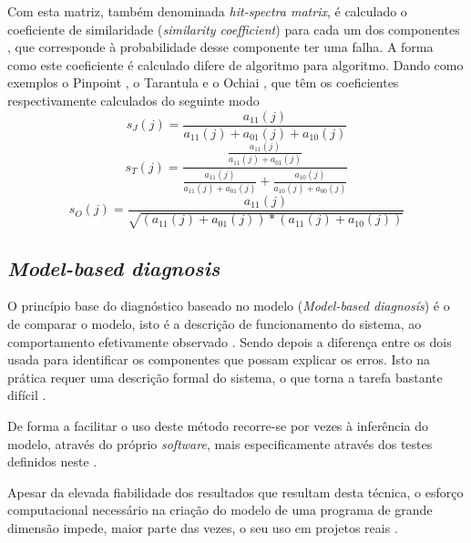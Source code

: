 Com esta matriz, também denominada \emph{hit-spectra matrix}, é calculado o coeficiente de similaridade (\emph{similarity coefficient}) para cada um dos componentes \cite{Abreu2009}, que corresponde à probabilidade desse componente ter uma falha. A forma como este coeficiente é calculado difere de algoritmo para algoritmo. Dando como exemplos o Pinpoint \cite{Chen2002}, o Tarantula \cite{Jones2005} e o Ochiai \cite{Abreu2007a}, que têm os coeficientes respectivamente calculados do seguinte modo
%
\begin{equation}
	s_J(j) = \frac {a_{11}(j)} {a_{11}(j) + a_{01}(j) + a_{10}(j)}
\end{equation}
%
\begin{equation}
	s_T(j) = \frac  { \frac {a_{11}(j)} {a_{11}(j) + a_{01}(j)} } 
				 	{ \frac{a_{11}(j)}{a_{11}(j) + a_{01}(j)} + \frac{a_{10}(j)}{a_{10}(j) + a_{00}(j)}}
\end{equation}
%
\begin{equation}
	s_O(j) = \frac  {a_{11}(j)} 
				 	{\sqrt{(a_{11}(j) + a_{01}(j)) * (a_{11}(j) + a_{10}(j))}}
\end{equation}




% 
%

\subsection{\emph{Model-based diagnosis}}

O princípio base do diagnóstico baseado no modelo (\emph{Model-based diagnosís}) é o de comparar o modelo, isto é a descrição de funcionamento do sistema, ao comportamento efetivamente observado \cite{Mayer2008}. Sendo depois a diferença entre os dois usada para identificar os componentes que possam explicar os erros. Isto na prática requer uma descrição formal do sistema, o que torna a tarefa bastante difícil \cite{Perez2004}.

De forma a facilitar o uso deste método recorre-se por vezes à inferência do modelo, através do próprio \emph{software}, mais especificamente através dos testes definidos neste \cite{Perez2004}.

Apesar da elevada fiabilidade dos resultados que resultam desta técnica, o esforço computacional necessário na criação do modelo de uma programa de grande dimensão impede, maior parte das vezes, o seu uso em projetos reais \cite{Mayer2008}.

% 
%

